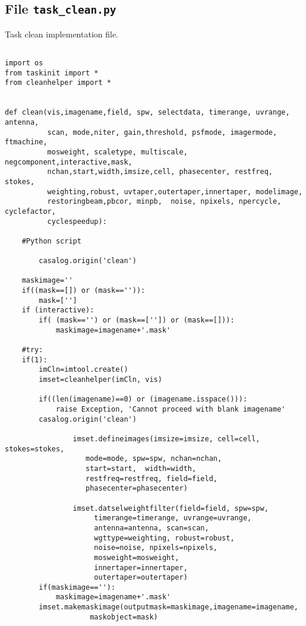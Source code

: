 
\subsection{File {\tt task\_clean.py} }
\label{section:write.clean.py}

Task clean implementation file.
\begin{verbatim}

import os
from taskinit import *
from cleanhelper import *


def clean(vis,imagename,field, spw, selectdata, timerange, uvrange, antenna, 
          scan, mode,niter, gain,threshold, psfmode, imagermode, ftmachine,
          mosweight, scaletype, multiscale, negcomponent,interactive,mask,
          nchan,start,width,imsize,cell, phasecenter, restfreq, stokes,
          weighting,robust, uvtaper,outertaper,innertaper, modelimage,
          restoringbeam,pbcor, minpb,  noise, npixels, npercycle, cyclefactor,
          cyclespeedup):

	#Python script

        casalog.origin('clean')

	maskimage=''
	if((mask==[]) or (mask=='')):
		mask=['']
	if (interactive):
		if( (mask=='') or (mask==['']) or (mask==[])):
			maskimage=imagename+'.mask'

	#try:
	if(1):
		imCln=imtool.create()
		imset=cleanhelper(imCln, vis)
		
		if((len(imagename)==0) or (imagename.isspace())):
			raise Exception, 'Cannot proceed with blank imagename'
		casalog.origin('clean')
		
                imset.defineimages(imsize=imsize, cell=cell, stokes=stokes,
				   mode=mode, spw=spw, nchan=nchan,
				   start=start,  width=width,
				   restfreq=restfreq, field=field,
				   phasecenter=phasecenter)
		
                imset.datselweightfilter(field=field, spw=spw,
					 timerange=timerange, uvrange=uvrange,
					 antenna=antenna, scan=scan,
					 wgttype=weighting, robust=robust,
					 noise=noise, npixels=npixels,
					 mosweight=mosweight,
					 innertaper=innertaper,
					 outertaper=outertaper)
		if(maskimage==''):
			maskimage=imagename+'.mask'
		imset.makemaskimage(outputmask=maskimage,imagename=imagename,
				    maskobject=mask)



\end{verbatim}
